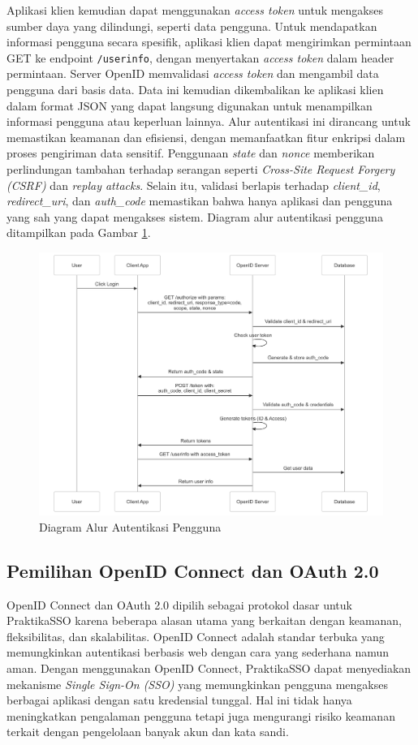 Aplikasi klien kemudian dapat menggunakan \emph{access token} untuk mengakses sumber daya yang dilindungi, seperti data pengguna. Untuk mendapatkan informasi pengguna secara spesifik, aplikasi klien dapat mengirimkan permintaan GET ke endpoint \texttt{/userinfo}, dengan menyertakan \emph{access token} dalam header permintaan. Server OpenID memvalidasi \emph{access token} dan mengambil data pengguna dari basis data. Data ini kemudian dikembalikan ke aplikasi klien dalam format JSON yang dapat langsung digunakan untuk menampilkan informasi pengguna atau keperluan lainnya. Alur autentikasi ini dirancang untuk memastikan keamanan dan efisiensi, dengan memanfaatkan fitur enkripsi dalam proses pengiriman data sensitif. Penggunaan \emph{state} dan \emph{nonce} memberikan perlindungan tambahan terhadap serangan seperti \emph{Cross-Site Request Forgery (CSRF)} dan \emph{replay attacks}. Selain itu, validasi berlapis terhadap \emph{client\_id}, \emph{redirect\_uri}, dan \emph{auth\_code} memastikan bahwa hanya aplikasi dan pengguna yang sah yang dapat mengakses sistem. Diagram alur autentikasi pengguna ditampilkan pada Gambar \ref{fig:auth_flow}.

\begin{figure}[H]
    \centering
    \includegraphics[width=1\textwidth]{gambar/auth_flow.png}
    \caption{Diagram Alur Autentikasi Pengguna}
    \label{fig:auth_flow}
\end{figure}


\subsection{Pemilihan OpenID Connect dan OAuth 2.0}
OpenID Connect dan OAuth 2.0 dipilih sebagai protokol dasar untuk PraktikaSSO karena beberapa alasan utama yang berkaitan dengan keamanan, fleksibilitas, dan skalabilitas. OpenID Connect adalah standar terbuka yang memungkinkan autentikasi berbasis web dengan cara yang sederhana namun aman. Dengan menggunakan OpenID Connect, PraktikaSSO dapat menyediakan mekanisme \emph{Single Sign-On (SSO)} yang memungkinkan pengguna mengakses berbagai aplikasi dengan satu kredensial tunggal. Hal ini tidak hanya meningkatkan pengalaman pengguna tetapi juga mengurangi risiko keamanan terkait dengan pengelolaan banyak akun dan kata sandi.

